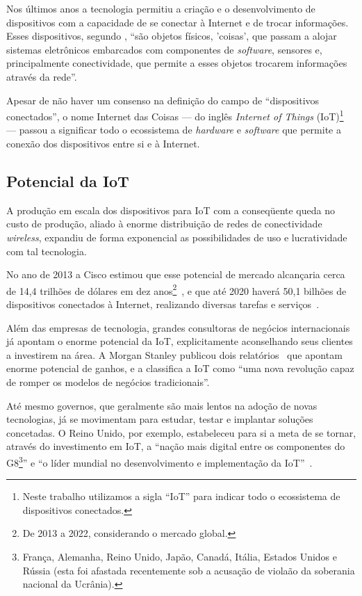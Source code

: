 \documentclass[pdftex, brazil, 12pt, twoside]{article}
\newcommand{\ingles}[1]{\textit{#1}}
\begin{document}
Nos últimos anos a tecnologia permitiu a criação e o desenvolvimento de dispositivos com a
capacidade de se conectar à Internet e de trocar informações. Esses dispositivos,
segundo \citet[][p.\ 23]{BarbozaTCCIoT2015}, ``são objetos físicos, 'coisas', que passam
a alojar sistemas eletrônicos embarcados com componentes de \ingles{software},
sensores e, principalmente conectividade, que permite a esses objetos trocarem
informações através da rede''.

Apesar de não haver um consenso na definição do campo de ``dispositivos conectados'',
o nome Internet das Coisas --- do inglês \ingles{Internet of Things} (IoT)\footnote{Neste trabalho
  utilizamos a sigla ``IoT'' para indicar todo o ecossistema de dispositivos conectados.} --- passou
a significar todo o ecossistema de \ingles{hardware} e \ingles{software} que
permite a conexão dos dispositivos entre si e à Internet.


\subsection{Potencial da IoT}
\label{intro-potencial}

A produção em escala dos dispositivos para IoT com a conseqüente queda no custo
de produção, aliado à enorme distribuição de redes de conectividade \ingles{wireless},
expandiu de forma exponencial as possibilidades de uso e lucratividade com
tal tecnologia.

No ano de 2013 a Cisco estimou que esse potencial
de mercado alcançaria cerca de 14,4 trilhões de dólares em dez anos\footnote{De 2013 a 2022, considerando
o mercado global.}~\citep{CiscoIoTFAQ2013},
e que até 2020 haverá 50,1 bilhões de dispositivos conectados à Internet,
realizando diversas tarefas e serviços~\citep{CiscoIoEConnectionsCounter}.

Além das empresas de tecnologia, grandes consultoras de negócios internacionais
já apontam o enorme potencial da IoT, explicitamente aconselhando
seus clientes a investirem na área.
A Morgan Stanley publicou dois relatórios~\citep{MorganStanleyIoTnow2013,MorganStanleyIoTpersonal2014}
que apontam enorme potencial de ganhos, e a \citet[][p.\ 4]{OliverWymanIoT2015} classifica
a IoT como ``uma nova revolução capaz de romper os modelos de negócios tradicionais''.

Até mesmo governos, que geralmente são mais lentos na adoção de novas tecnologias, já
se movimentam para estudar, testar e implantar soluções concetadas. O Reino Unido,
por exemplo, estabeleceu para si a meta de se tornar, através do investimento em IoT,
a ``nação mais digital entre os componentes do G8\footnote{França, Alemanha, Reino Unido,
  Japão, Canadá, Itália, Estados Unidos e Rússia (esta foi afastada recentemente sob
  a acusação de violaão da soberania nacional da Ucrânia).}'' e 
``o líder mundial no desenvolvimento e implementação da IoT''~\citep[][p.\ 5]{UKGOSWalportIoT2014}.
\end{document}
